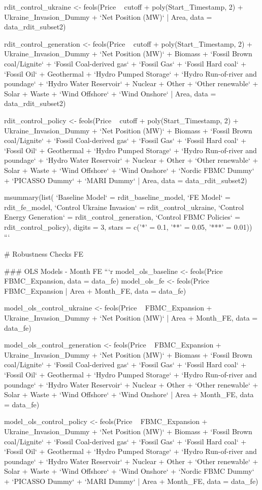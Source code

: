 rdit_control_ukraine <- feols(Price ~ cutoff + poly(Start_Timestamp, 2) + Ukraine_Invasion_Dummy + `Net Position (MW)` | Area, data = data_rdit_subset2)

rdit_control_generation <- feols(Price ~ cutoff + poly(Start_Timestamp, 2) + Ukraine_Invasion_Dummy + `Net Position (MW)` + Biomass + `Fossil Brown coal/Lignite` + `Fossil Coal-derived gas` + `Fossil Gas` + `Fossil Hard coal` + `Fossil Oil` + Geothermal + `Hydro Pumped Storage` + `Hydro Run-of-river and poundage` + `Hydro Water Reservoir` + Nuclear + Other + `Other renewable` + Solar + Waste + `Wind Offshore` + `Wind Onshore` | Area, data = data_rdit_subset2)

rdit_control_policy <- feols(Price ~ cutoff + poly(Start_Timestamp, 2) + Ukraine_Invasion_Dummy + `Net Position (MW)` + Biomass + `Fossil Brown coal/Lignite` + `Fossil Coal-derived gas` + `Fossil Gas` + `Fossil Hard coal` + `Fossil Oil` + Geothermal + `Hydro Pumped Storage` + `Hydro Run-of-river and poundage` + `Hydro Water Reservoir` + Nuclear + Other + `Other renewable` + Solar + Waste + `Wind Offshore` + `Wind Onshore` + `Nordic FBMC Dummy` + `PICASSO Dummy` + `MARI Dummy` | Area, data = data_rdit_subset2)

msummary(list(
    `Baseline Model` = rdit_baseline_model,
    `FE Model` = rdit_fe_model,
    `Control Ukraine Invasion` = rdit_control_ukraine,
    `Control Energy Generation` = rdit_control_generation,
    `Control FBMC Policies` = rdit_control_policy),
  digits = 3,
  stars = c('*' = 0.1, '**' = 0.05, '***' = 0.01))
```

# Robustness Checks FE

### OLS Models - Month FE
```{r}
model_ols_baseline <- feols(Price ~ FBMC_Expansion, data = data_fe)
model_ols_fe <- feols(Price ~ FBMC_Expansion | Area + Month_FE, data = data_fe)
  
model_ols_control_ukraine <- feols(Price ~ FBMC_Expansion + Ukraine_Invasion_Dummy + `Net Position (MW)` | Area + Month_FE, data = data_fe)

model_ols_control_generation <- feols(Price ~ FBMC_Expansion + Ukraine_Invasion_Dummy + `Net Position (MW)` + Biomass + `Fossil Brown coal/Lignite` + `Fossil Coal-derived gas` + `Fossil Gas` + `Fossil Hard coal` + `Fossil Oil` + Geothermal + `Hydro Pumped Storage` + `Hydro Run-of-river and poundage` + `Hydro Water Reservoir` + Nuclear + Other + `Other renewable` + Solar + Waste + `Wind Offshore` + `Wind Onshore` | Area + Month_FE, data = data_fe)

model_ols_control_policy <- feols(Price ~ FBMC_Expansion + Ukraine_Invasion_Dummy + `Net Position (MW)` + Biomass + `Fossil Brown coal/Lignite` + `Fossil Coal-derived gas` + `Fossil Gas` + `Fossil Hard coal` + `Fossil Oil` + Geothermal + `Hydro Pumped Storage` + `Hydro Run-of-river and poundage` + `Hydro Water Reservoir` + Nuclear + Other + `Other renewable` + Solar + Waste + `Wind Offshore` + `Wind Onshore` + `Nordic FBMC Dummy` + `PICASSO Dummy` + `MARI Dummy` | Area + Month_FE, data = data_fe)

